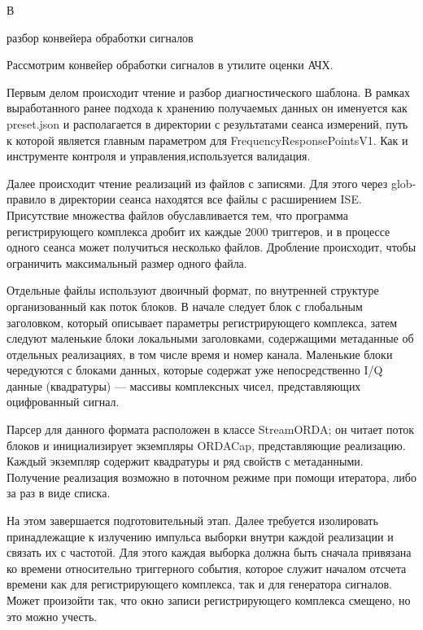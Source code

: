 \documentclass{report}
\begin{document}
\pagebreak
\begin{flushright}
     В
\end{flushright}

\begin{center}   разбор конвейера обработки сигналов \end{center}

Рассмотрим конвейер обработки сигналов в утилите оценки АЧХ.

Первым делом происходит чтение и разбор диагностического шаблона. В рамках выработанного ранее подхода к хранению получаемых данных он именуется как preset.json и располагается в директории с результатами сеанса измерений, путь к которой является главным параметром для FrequencyResponsePointsV1. Как и инструменте контроля и управления,используется валидация.

Далее происходит чтение реализаций из файлов с записями. Для этого через glob-правило в директории сеанса находятся все файлы с расширением ISE. Присутствие множества файлов обуславливается тем, что программа регистрирующего комплекса дробит их каждые 2000 триггеров, и в процессе одного сеанса может получиться несколько файлов. Дробление происходит, чтобы ограничить максимальный размер одного файла.

Отдельные файлы используют двоичный формат, по внутренней структуре организованный как поток блоков. В начале следует блок с глобальным заголовком, который описывает параметры регистрирующего комплекса, затем следуют маленькие блоки локальными заголовками, содержащими метаданные об отдельных реализациях, в том числе время и номер канала. Маленькие блоки чередуются с блоками данных, которые содержат уже непосредственно I/Q данные (квадратуры) --- массивы комплексных чисел, представляющих оцифрованный сигнал.

Парсер для данного формата расположен в классе StreamORDA; он читает поток блоков и инициализирует экземпляры ORDACap, представляющие реализацию. Каждый экземпляр содержит квадратуры и ряд свойств с метаданными. Получение реализация возможно в поточном режиме при помощи итератора, либо за раз в виде списка.

На этом завершается подготовительный этап. Далее требуется изолировать принадлежащие к излучению импульса выборки внутри каждой реализации и связать их с частотой. Для этого каждая выборка должна быть сначала привязана ко времени относительно триггерного события, которое служит началом отсчета времени как для регистрирующего комплекса, так и для генератора сигналов. Может произойти так, что окно записи регистрирующего комплекса смещено, но это можно учесть.
\end{document}
